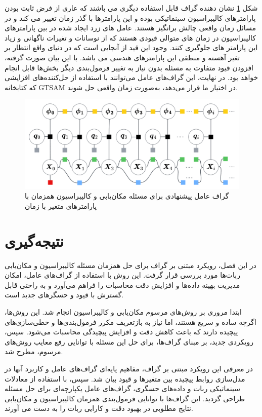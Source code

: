 شکل 
\ref{fig:kinematiclocalizationbasicnonstationatyparam}
نشان دهنده گراف قابل استفاده دیگری می باشند که عاری از فرض ثابت بودن پارامترهای کالیبراسیون سینماتیکی بوده و این پارامترها با گذر زمان تغییر می کند و در مسائل زمان واقعی چالش برانگیز هستند. عامل های زرد ایجاد شده در بین پارامترهای کالیبراسیون در زمان های متوالی قیودی هستند که از نوسانات و تغیرات ناگهانی و زیاد این پارامتر های جلوگیری کنند. وجود این قید از آنجایی است که در دنیای واقع انتظار بر تغیر آهسته و منطقی این پارامترهای هندسی می باشد. 
با این بیان صورت گرفته، افزودن قیود متفاوت به مسئله بدون نیاز به تغییر فرمول‌بندی دیگر بخش‌ها قابل انجام خواهد بود. در نهایت، این گراف‌های عامل می‌توانند با استفاده از حل‌کننده‌های افزایشی که کتابخانه GTSAM در اختیار ما قرار می‌دهد، به‌صورت زمان واقعی حل شوند. 
\begin{figure}[b]
	\centering
	\includegraphics[width=0.8\linewidth]{img/Kinematic_localization_basic_nonstationaty_param}
	\caption{گراف عامل پیشنهادی برای مسئله مکان‌یابی و کالیبراسیون همزمان با پارامتر‌های متغیر با زمان}
	\label{fig:kinematiclocalizationbasicnonstationatyparam}
\end{figure}


\section{نتیجه‌گیری}

در این فصل، رویکرد مبتنی بر گراف برای حل همزمان مسئله کالیبراسیون و مکان‌یابی ربات‌ها مورد بررسی قرار گرفت. این روش با استفاده از گراف‌های عامل، امکان مدیریت بهینه داده‌ها و افزایش دقت محاسبات را فراهم می‌آورد و به راحتی قابل گسترش با قیود و حسگرهای جدید است.

ابتدا مروری بر روش‌های مرسوم مکان‌یابی و کالیبراسیون انجام شد. این روش‌ها، اگرچه ساده و سریع هستند، اما نیاز به بازتعریف مکرر فرمول‌بندی‌ها و خطی‌سازی‌های پیچیده دارند که باعث کاهش دقت و افزایش پیچیدگی محاسبات می‌شود. سپس، رویکردی جدید، بر مبنای گراف‌ها، برای حل این مسئله با توانایی رفع معایب روش‌های مرسوم، مطرح شد.

در معرفی این رویکرد مبتنی بر گراف، مفاهیم پایه‌ای گراف‌های عامل و کاربرد آنها در مدل‌سازی روابط پیچیده بین متغیرها و قیود بیان شد. سپس، با استفاده از معادلات سینماتیکی ربات و داده‌های حسگری، گراف‌های عامل یکپارچه‌ای برای حل مسئله طراحی گردید. این گراف‌ها با توانایی فرمول‌بندی همزمان کالیبراسیون و مکان‌یابی نتایج مطلوبی در بهبود دقت و کارایی ربات را به دست می آورند.



 
 
 
 